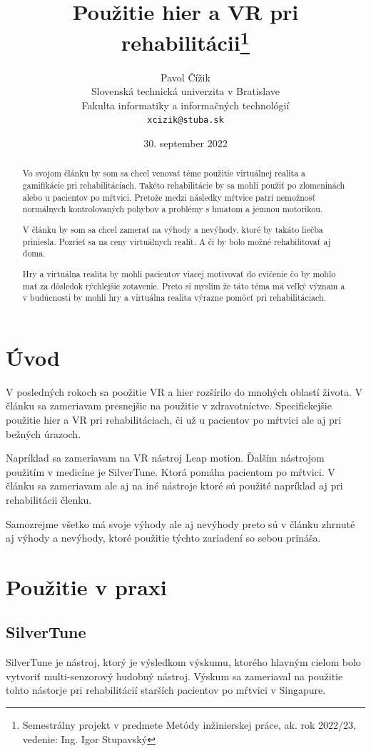 \documentclass[10pt,twoside,slovak,a4paper]{article}
\title{Použitie hier a VR pri rehabilitácii\thanks{Semestrálny projekt v predmete Metódy inžinierskej práce, ak. rok 2022/23, vedenie: Ing. Igor Stupavský}} %
\author{Pavol Čížik\\[2pt]
	{\small Slovenská technická univerzita v Bratislave}\\
	{\small Fakulta informatiky a informačných technológií}\\
	{\small \texttt{xcizik@stuba.sk}}
	}
\date{\small 30. september 2022}
\begin{document}
\maketitle

\begin{abstract}
Vo svojom článku by som sa chcel venovať téme použitie virtuálnej realita a gamifikácie pri rehabilitáciach. Takéto rehabilitácie by sa mohli použiť po zlomeninách alebo u pacientov po mŕtvici. Pretože medzi následky mŕtvice patrí nemožnosť normálnych kontrolovaných pohybov a problémy s hmatom a jemnou motorikou. 

V článku by som sa chcel zamerať na výhody a nevýhody, ktoré by takáto liečba priniesla. Pozrieť sa na ceny virtuálnych realít. A či by bolo možné rehabilitovať aj doma. 

Hry a virtuálna realita by mohli pacientov viacej motivovať do cvičenie čo by mohlo mať za dôsledok rýchlejšie zotavenie. Preto si myslím že táto téma má veľký význam a v budúcnosti by mohli hry a virtuálna realita výrazne pomôcť pri rehabilitáciach.
\end{abstract}



\section{Úvod}

V posledných rokoch sa poožitie VR a hier rozšírilo do mnohých oblastí života. V článku sa zameriavam presnejšie na použitie v zdravotníctve. Specifickejšie použitie hier a VR pri rehabilitáciach, či už u pacientov po mŕtvici ale aj pri bežných úrazoch. 

Napríklad sa zameriavam na VR nástroj Leap motion. Ďalším nástrojom použitím v medicíne je  SilverTune. Ktorá pomáha pacientom po mŕtvici. V článku sa zameriavam ale aj na iné nástroje ktoré sú použité napríklad aj pri rehabilitácii členku. 

Samozrejme všetko má svoje výhody ale aj nevýhody preto sú v článku zhrnuté aj výhody a nevýhody, ktoré použitie týchto zariadení so sebou prináša.

\newpage

\section{Použitie v praxi}


\subsection{SilverTune}
SilverTune je nástroj, ktorý je výsledkom výskumu, ktorého hlavným cielom bolo vytvoriť multi-senzorový hudobný nástroj. Výskum sa zameriaval na použitie tohto nástorje pri rehabilitácií starších pacientov po mŕtvici v Singapure.
\end{document}
